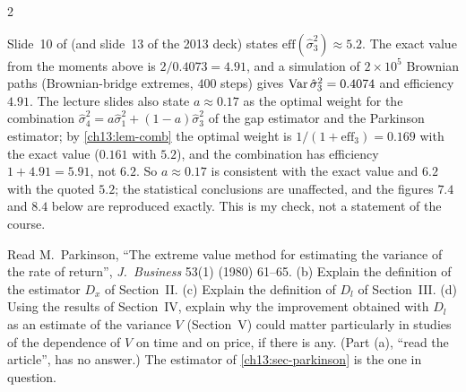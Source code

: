 \begin{paracol}{2}
\begin{coursenote}\label{ch13:cn-park}
Slide~10 of  (and slide~13 of the 2013 deck) states $\mathrm{eff}(\hat\sigma_3^2)\approx5.2$. The exact value from
the moments above is $2/0.4073=4.91$, and a simulation of $2\times10^5$ Brownian paths (Brownian-bridge extremes, $400$ steps) gives $\operatorname{Var}\hat\sigma_3^2=0.4074$ and
efficiency $4.91$. The lecture slides also state $a\approx0.17$ as the optimal weight for the combination
$\hat\sigma_4^2=a\hat\sigma_1^2+(1-a)\hat\sigma_3^2$ of the gap estimator and the Parkinson estimator; by \cref{ch13:lem-comb} the optimal weight is $1/(1+\mathrm{eff}_3)=0.169$ with the exact value ($0.161$ with $5.2$), and the combination has
efficiency $1+4.91=5.91$, not $6.2$. So $a\approx0.17$ is consistent with the exact value and $6.2$ with the quoted $5.2$; the
statistical conclusions are unaffected, and the figures $7.4$ and $8.4$ below are reproduced exactly. This is my check, not a statement of the course.
\end{coursenote}

\begin{exercise}\label{ch13:ex-ps5-p3}
Read M.~Parkinson, ``The extreme value method for estimating the variance of the rate of return'', \emph{J.\ Business} 53(1) (1980) 61--65. (b) Explain the definition of the estimator $D_x$ of Section~II. (c) Explain the definition of $D_l$ of Section~III. (d) Using the results of Section~IV,
explain why the improvement obtained with $D_l$ as an estimate of the variance $V$ (Section~V) could matter particularly in studies of the dependence of $V$ on time and on price, if there is any. (Part (a), ``read the article'', has no answer.) The estimator of \cref{ch13:sec-parkinson} is the one in question.
\end{exercise}


\end{paracol}
